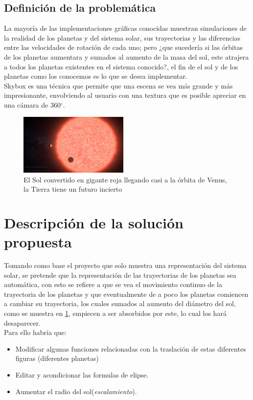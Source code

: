 \documentclass[12pt,journal,compsoc]{IEEEtran}
\begin{document}
\subsection{Definición de la problemática}
La mayoría de las implementaciones gráficas conocidas muestran simulaciones de la realidad de los planetas y del sistema solar, sus trayectorias y las diferencias entre las velocidades de rotación de cada uno; pero ¿que sucedería si las órbitas de los planetas aumentara y sumados al aumento de la masa del sol, este atrajera a todos los planetas existentes en el sistema conocido?, el fin de el sol y de los planetas como los conocemos es lo que se desea implementar.\\
Skybox es una técnica que permite que una escena se vea más grande y más impresionante, envolviendo al usuario con una textura que es posible apreciar en una cámara de 360$^{\circ}$\cite{skybox2}.
\begin{figure}[h!]
  \includegraphics[width=0.48\textwidth]{sol.jpg}
  \caption{El Sol convertido en gigante roja llegando casi a la órbita de Venus, la Tierra tiene un futuro incierto}
  \captionsetup{justification=centering}
  \label{muerte}
\end{figure}
\section{Descripción de la solución propuesta}
Tomando como base el proyecto que solo muestra una representación del sistema solar, se pretende que la representación de las trayectorias de los planetas sea automática, con esto se refiere a que se vea el movimiento continuo de la trayectoria de los planetas y que eventualmente de a poco los planetas comiencen a cambiar su trayectoria, los cuales sumados al aumento del diámetro del sol, como se muestra en \ref{muerte}, empiecen a ser absorbidos por este, lo cual los hará desaparecer\cite{far}.\\
Para ello habría que:
\begin{itemize}
 \item Modificar algunas funciones relacionadas con la traslación de estas diferentes figuras (diferentes planetas)
 \item Editar y acondicionar las formulas de elipse.
 \item Aumentar el radio del sol(\textit{escalamiento}).
\end{itemize}   %
\end{document}
